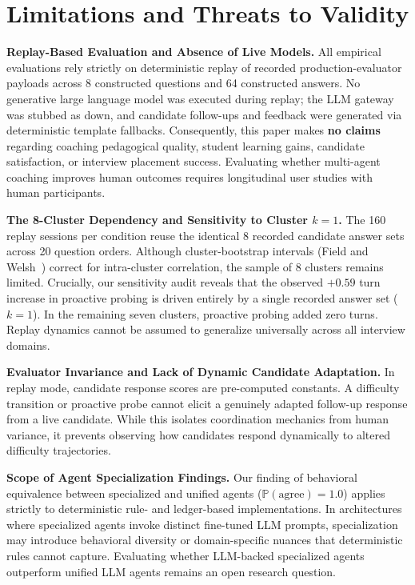 \section{Limitations and Threats to Validity}\label{sec:limits}

\noindent\textbf{Replay-Based Evaluation and Absence of Live Models.} All empirical evaluations rely strictly on deterministic replay of recorded production-evaluator payloads across 8 constructed questions and 64 constructed answers. No generative large language model was executed during replay; the LLM gateway was stubbed as down, and candidate follow-ups and feedback were generated via deterministic template fallbacks. Consequently, this paper makes \textbf{no claims} regarding coaching pedagogical quality, student learning gains, candidate satisfaction, or interview placement success. Evaluating whether multi-agent coaching improves human outcomes requires longitudinal user studies with human participants.

\noindent\textbf{The 8-Cluster Dependency and Sensitivity to Cluster $k=1$.} The 160 replay sessions per condition reuse the identical 8 recorded candidate answer sets across 20 question orders. Although cluster-bootstrap intervals (Field and Welsh~\cite{fw07}) correct for intra-cluster correlation, the sample of 8 clusters remains limited. Crucially, our sensitivity audit reveals that the observed $+0.59$ turn increase in proactive probing is driven entirely by a single recorded answer set ($k=1$). In the remaining seven clusters, proactive probing added zero turns. Replay dynamics cannot be assumed to generalize universally across all interview domains.

\noindent\textbf{Evaluator Invariance and Lack of Dynamic Candidate Adaptation.} In replay mode, candidate response scores are pre-computed constants. A difficulty transition or proactive probe cannot elicit a genuinely adapted follow-up response from a live candidate. While this isolates coordination mechanics from human variance, it prevents observing how candidates respond dynamically to altered difficulty trajectories.

\noindent\textbf{Scope of Agent Specialization Findings.} Our finding of behavioral equivalence between specialized and unified agents ($\mathbb{P}(\text{agree}) = 1.0$) applies strictly to deterministic rule- and ledger-based implementations. In architectures where specialized agents invoke distinct fine-tuned LLM prompts, specialization may introduce behavioral diversity or domain-specific nuances that deterministic rules cannot capture. Evaluating whether LLM-backed specialized agents outperform unified LLM agents remains an open research question.

